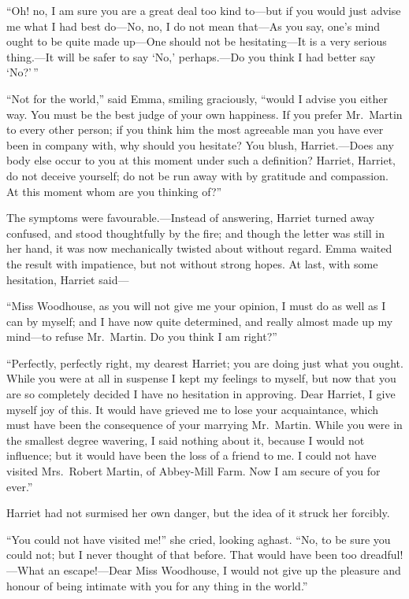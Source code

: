 ``Oh! no, I am sure you are a great deal too kind to---but if you
would just advise me what I had best do---No, no, I do not mean
that---As you say, one's mind ought to be quite made up---One should
not be hesitating---It is a very serious thing.---It will be safer
to say `No,' perhaps.---Do you think I had better say `No?'\,''

``Not for the world,'' said Emma, smiling graciously, ``would I advise
you either way.  You must be the best judge of your own happiness.
If you prefer Mr.\ Martin to every other person; if you think him
the most agreeable man you have ever been in company with, why should
you hesitate? You blush, Harriet.---Does any body else occur to you
at this moment under such a definition? Harriet, Harriet, do not
deceive yourself; do not be run away with by gratitude and compassion.
At this moment whom are you thinking of?''

The symptoms were favourable.---Instead of answering, Harriet turned
away confused, and stood thoughtfully by the fire; and though
the letter was still in her hand, it was now mechanically twisted
about without regard.  Emma waited the result with impatience,
but not without strong hopes.  At last, with some hesitation,
Harriet said---%

``Miss Woodhouse, as you will not give me your opinion, I must
do as well as I can by myself; and I have now quite determined,
and really almost made up my mind---to refuse Mr.\ Martin.  Do you
think I am right?''

``Perfectly, perfectly right, my dearest Harriet; you are doing just
what you ought.  While you were at all in suspense I kept my feelings
to myself, but now that you are so completely decided I have no
hesitation in approving.  Dear Harriet, I give myself joy of this.
It would have grieved me to lose your acquaintance, which must have
been the consequence of your marrying Mr.\ Martin.  While you were in
the smallest degree wavering, I said nothing about it, because I would
not influence; but it would have been the loss of a friend to me.
I could not have visited Mrs.\ Robert Martin, of Abbey-Mill Farm.
Now I am secure of you for ever.''

Harriet had not surmised her own danger, but the idea of it struck
her forcibly.

``You could not have visited me!'' she cried, looking aghast.
``No, to be sure you could not; but I never thought of that before.
That would have been too dreadful!---What an escape!---Dear Miss Woodhouse,
I would not give up the pleasure and honour of being intimate with you
for any thing in the world.''


